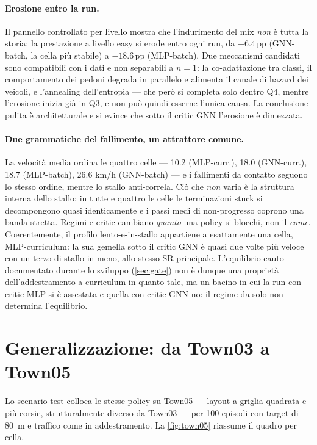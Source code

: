 \paragraph{Erosione entro la run.}
Il pannello controllato per livello mostra che l'indurimento del mix
\emph{non} è tutta la storia: la prestazione a livello easy si erode
entro ogni run, da $-6.4$\,pp (GNN-batch, la cella più stabile) a
$-18.6$\,pp (MLP-batch). Due meccanismi candidati sono compatibili
con i dati e non separabili a $n{=}1$: la co-adattazione tra classi,
il comportamento dei pedoni degrada in parallelo e alimenta il
canale di hazard dei veicoli, e l'annealing dell'entropia --- che però
si completa solo dentro Q4, mentre l'erosione inizia già in Q3, e non
può quindi esserne l'unica causa. La conclusione pulita è
architetturale e si evince che sotto il critic GNN l'erosione è dimezzata.

\paragraph{Due grammatiche del fallimento, un attrattore comune.}
La velocità media ordina le quattro celle --- 10.2 (MLP-curr.), 18.0
(GNN-curr.), 18.7 (MLP-batch), 26.6 km/h (GNN-batch) --- e i fallimenti
da contatto seguono lo stesso ordine, mentre lo stallo anti-correla. Ciò
che \emph{non} varia è la struttura interna dello stallo: in tutte e
quattro le celle le terminazioni stuck si decompongono quasi
identicamente e i passi medi di non-progresso coprono una banda stretta.
Regimi e critic cambiano \emph{quanto} una policy si blocchi, non il
\emph{come}. Coerentemente, il profilo lento-e-in-stallo
appartiene a esattamente una cella, MLP-curriculum: la sua gemella sotto
il critic GNN è quasi due volte più veloce con un terzo di stallo in
meno, allo stesso SR principale. L'equilibrio cauto documentato durante
lo sviluppo (\cref{sec:gate}) non è dunque una proprietà
dell'addestramento a curriculum in quanto tale, ma un bacino in cui la
run con critic MLP si è assestata e quella con critic GNN no: il regime
da solo non determina l'equilibrio.

\section{Generalizzazione: da Town03 a Town05}
\label{sec:generalizzazione}

Lo scenario test colloca le stesse policy su Town05 --- layout a griglia
quadrata e più corsie, strutturalmente diverso da Town03 --- per 100
episodi con target di \SI{80}{m} e traffico come in addestramento. La
\cref{fig:town05} riassume il quadro per cella.

